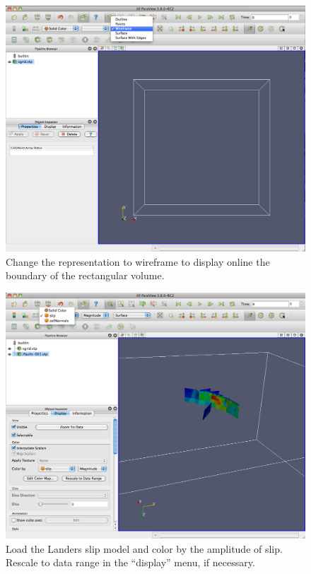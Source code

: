 \documentclass[10pt]{article}
\begin{document}
%
\begin{figure}
\begin{center}
\includegraphics[width=\textwidth]{paraview-cgrid-2.png}
\end{center}
\small
\caption{Change the representation to wireframe to display online the boundary of the rectangular volume.}
\label{fig:cgrid-2}
\end{figure}
%

%
\begin{figure}
\begin{center}
\includegraphics[width=\textwidth]{paraview-rfaults.png}
\end{center}
\small
\caption{Load the Landers slip model and color by the amplitude of slip. Rescale to data range in the ``display'' menu, if necessary.}
\label{fig:rfaults}
\end{figure}
%
\end{document}
